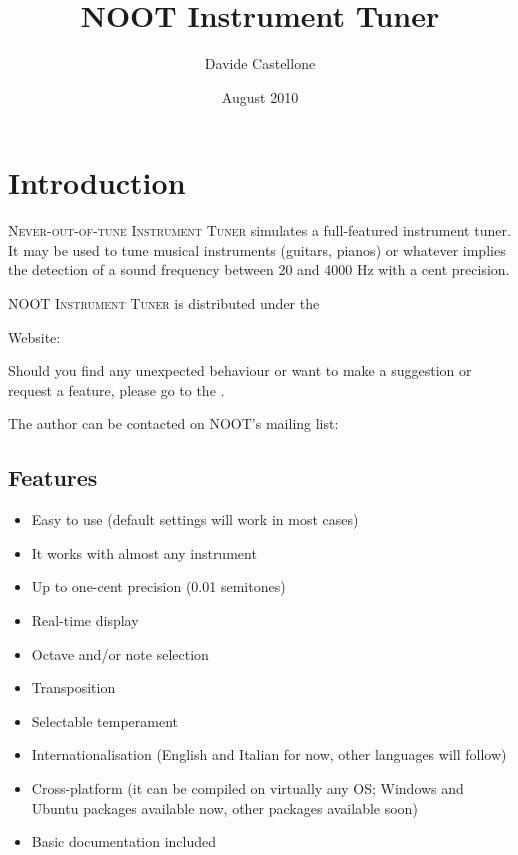 \newcommand{\noun}[1]{\textsc{#1}}

\makeindex


\author{Davide Castellone}
\title{NOOT Instrument Tuner}
\date{August 2010}
\maketitle
\tableofcontents

\pagestyle{fancyplain}%

\chapter{Introduction}\label{introduction}

\noun{Never-out-of-tune Instrument Tuner} simulates a full-featured instrument tuner. It may
be used to tune musical instruments (guitars, pianos) or whatever
implies the detection of a sound frequency between 20 and 4000 Hz with a cent precision.

\noun{NOOT Instrument Tuner} is distributed under the

Website: 

Should you find any unexpected behaviour or want to make a suggestion or request a feature,
please go to the .

The author can be contacted on NOOT's mailing list:

\section{Features}\label{features}

\begin{itemize}
	\item Easy to use (default settings will work in most cases)
	\item It works with almost any instrument
	\item Up to one-cent precision (0.01 semitones)
	\item Real-time display
	\item Octave and/or note selection
	\item Transposition
	\item Selectable temperament
	\item Internationalisation (English and Italian for now, other languages will follow)
	\item Cross-platform (it can be compiled on virtually any OS;
		Windows and Ubuntu packages available now,  other packages available soon)
	\item Basic documentation included
\end{itemize}

